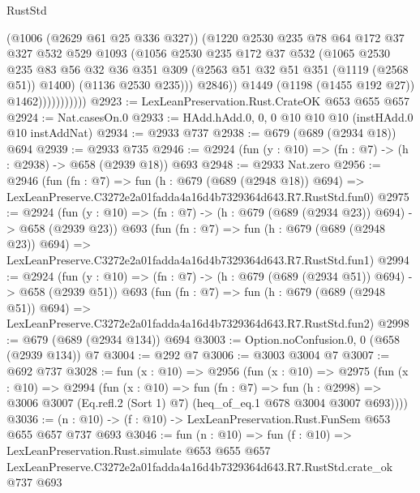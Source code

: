 \begin{lexlean}{RustStd}
\begin{coremodule}
                            (@1006 (@2629 @61 @25 @336 @327))
                            (@1220
                              @2530
                              @235
                              @78
                              @64
                              @172
                              @37
                              @327
                              @532
                              @529
                              @1093
                              (@1056
                                @2530
                                @235
                                @172
                                @37
                                @532
                                (@1065
                                  @2530
                                  @235
                                  @83
                                  @56
                                  @32
                                  @36
                                  @351
                                  @309
                                  (@2563 @51 @32 @51 @351 (@1119 (@2568 @51)) @1400)
                                  (@1136 @2530 @235)))
                              @2846))
                          @1449
                          (@1198 (@1455 @192 @27))
                          @1462)))))))))))
@2923 := LexLeanPreservation.Rust.CrateOK @653 @655 @657
@2924 := Nat.casesOn.{0}
@2933 := HAdd.hAdd.{0, 0, 0} @10 @10 @10 (instHAdd.{0} @10 instAddNat)
@2934 := @2933 @737
@2938 := @679 (@689 (@2934 @18)) @694
@2939 := @2933 @735
@2946 := @2924 (fun (y : @10) => (fn : @7) -> (h : @2938) -> @658 (@2939 @18)) @693
@2948 := @2933 Nat.zero
@2956 := @2946
    (fun (fn : @7) =>
    fun (h : @679 (@689 (@2948 @18)) @694) =>
    LexLeanPreserve.C3272e2a01fadda4a16d4b7329364d643.R7.RustStd.fun0)
@2975 := @2924
    (fun (y : @10) => (fn : @7) -> (h : @679 (@689 (@2934 @23)) @694) -> @658 (@2939 @23))
    @693
    (fun (fn : @7) =>
    fun (h : @679 (@689 (@2948 @23)) @694) =>
    LexLeanPreserve.C3272e2a01fadda4a16d4b7329364d643.R7.RustStd.fun1)
@2994 := @2924
    (fun (y : @10) => (fn : @7) -> (h : @679 (@689 (@2934 @51)) @694) -> @658 (@2939 @51))
    @693
    (fun (fn : @7) =>
    fun (h : @679 (@689 (@2948 @51)) @694) =>
    LexLeanPreserve.C3272e2a01fadda4a16d4b7329364d643.R7.RustStd.fun2)
@2998 := @679 (@689 (@2934 @134)) @694
@3003 := Option.noConfusion.{0, 0} (@658 (@2939 @134)) @7
@3004 := @292 @7
@3006 := @3003 @3004 @7
@3007 := @692 @737
@3028 := fun (x : @10) =>
  @2956
    (fun (x : @10) =>
    @2975
      (fun (x : @10) =>
      @2994
        (fun (x : @10) =>
        fun (fn : @7) =>
        fun (h : @2998) =>
        @3006 @3007 (Eq.refl.{2} (Sort 1) @7) (heq_of_eq.{1} @678 @3004 @3007 @693))))
@3036 := (n : @10) -> (f : @10) -> LexLeanPreservation.Rust.FunSem @653 @655 @657 @737 @693
@3046 := fun (n : @10) =>
  fun (f : @10) =>
  LexLeanPreservation.Rust.simulate
    @653
    @655
    @657
    LexLeanPreserve.C3272e2a01fadda4a16d4b7329364d643.R7.RustStd.crate_ok
    @737
    @693
\end{coremodule}
\end{lexlean}
